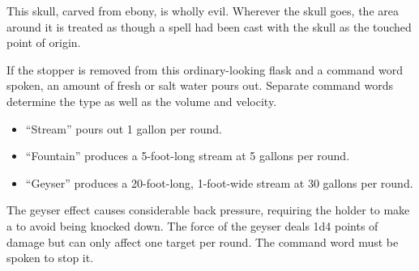 {

\begin{comment}
Cubic Gate:} This item is fashioned from carnelian. Each of the six sides of the cube is keyed to a plane, one of which is the Material Plane. The character creating the item should choose the planes to which the other five sides are keyed.

If a side of the cubic gate is pressed once, it opens a gate to a random point on the plane keyed to that side. There is a 10\% chance per minute that an outsider from that plane (determine randomly) comes through it looking for food, fun, or trouble. Pressing the side a second time closes the gate. It is impossible to open more than one gate at a time.

If a side is pressed twice in quick succession, the character so doing is transported to a random point on the other plane, along with all creatures in adjacent squares. (The other creatures may avoid this fate by succeeding on DC 23 Will saves).

Strong conjuration; CL 13th; Craft Wondrous Item, plane shift; Price 164,000 gp.
\end{comment}

 This skull, carved from ebony, is wholly evil. Wherever the skull goes, the area around it is treated as though a  spell had been cast with the skull as the touched point of origin.


 If the stopper is removed from this ordinary-looking flask and a command word spoken, an amount of fresh or salt water pours out. Separate command words determine the type as well as the volume and velocity.
\begin{itemize}
\item ``Stream'' pours out 1 gallon per round.
\item ``Fountain'' produces a 5-foot-long stream at 5 gallons per round.
\item ``Geyser'' produces a 20-foot-long, 1-foot-wide stream at 30 gallons per round.
\end{itemize}

The geyser effect causes considerable back pressure, requiring the holder to make a  to avoid being knocked down. The force of the geyser deals 1d4 points of damage but can only affect one target per round. The command word must be spoken to stop it.

}
